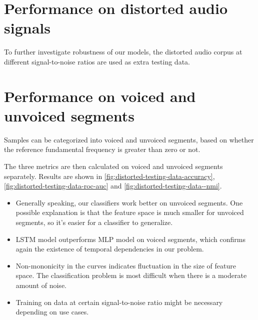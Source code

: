 \documentclass[11pt,a4paper]{report}
\begin{document}
\newpage

\section{Performance on distorted audio signals}

To further investigate robustness of our models, the distorted audio corpus at different signal-to-noise ratios are used as extra testing data.

\section{Performance on voiced and unvoiced segments}

Samples can be categorized into voiced and unvoiced segments, based on whether the reference fundamental frequency is greater than zero or not.

The three metrics are then calculated on voiced and unvoiced segments separately. Results are shown in \autoref{fig:distorted-testing-data-accuracy}, \autoref{fig:distorted-testing-data-roc-auc} and \autoref{fig:distorted-testing-data--nmi}.

\begin{itemize}
  \item Generally speaking, our classifiers work better on unvoiced segments. One possible explanation is that the feature space is much smaller for unvoiced segments, so it's easier for a classifier to generalize.
  \item LSTM model outperforms MLP model on voiced segments, which confirms again the existence of temporal dependencies in our problem.
  \item Non-mononicity in the curves indicates fluctuation in the size of feature space. The classification problem is most difficult when there is a moderate amount of noise.
  \item Training on data at certain signal-to-noise ratio might be necessary depending on use cases.
\end{itemize}
\end{document}
